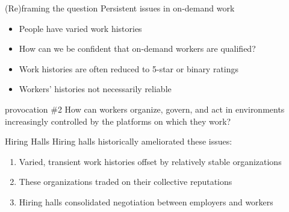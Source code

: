 \documentclass[presentation]{subfiles}
\begin{document}
\begin{frame}{(Re)framing the question}
Persistent issues in on-demand work
\begin{itemize}
\item People have varied work histories
\item How can we be confident that on-demand workers are qualified?
\item Work histories are often reduced to 5-star or binary ratings
\item Workers' histories not necessarily reliable
\end{itemize}

\end{frame}

\begin{frame}[standout]{provocation \#2}
  How can workers \alert{organize}, \alert{govern}, and \alert{act} in environments increasingly controlled by the platforms on which they work?
\end{frame}


\begin{frame}{Hiring Halls}
  Hiring halls historically ameliorated these issues:
  \begin{enumerate}
    \item Varied, transient work histories offset by relatively stable organizations
    \item These organizations traded on their collective reputations
    \item Hiring halls consolidated negotiation between employers and workers
  \end{enumerate}

\end{frame}



\end{document}
